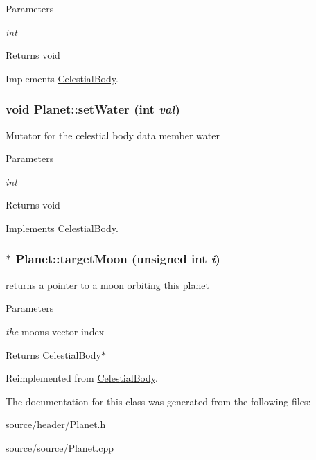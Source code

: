 \begin{DoxyParams}{Parameters}
\item[{\em int}]\end{DoxyParams}
\begin{DoxyReturn}{Returns}
void 
\end{DoxyReturn}


Implements \hyperlink{classCelestialBody}{CelestialBody}.

\hypertarget{classPlanet_afbc0d813ae0d2a958487cfc2a06fd9d1}{
\subsubsection[{setWater}]{\setlength{\rightskip}{0pt plus 5cm}void Planet::setWater (int {\em val})}}
\label{d5/dec/classPlanet_afbc0d813ae0d2a958487cfc2a06fd9d1}
Mutator for the celestial body data member water


\begin{DoxyParams}{Parameters}
\item[{\em int}]\end{DoxyParams}
\begin{DoxyReturn}{Returns}
void 
\end{DoxyReturn}


Implements \hyperlink{classCelestialBody}{CelestialBody}.

\hypertarget{classPlanet_a86eb8c5701ace894c2ca47b80ae776e9}{
\subsubsection[{targetMoon}]{ $\ast$ Planet::targetMoon (unsigned int {\em i})}}
\label{d5/dec/classPlanet_a86eb8c5701ace894c2ca47b80ae776e9}
returns a pointer to a moon orbiting this planet


\begin{DoxyParams}{Parameters}
\item[{\em the}]moons vector index\end{DoxyParams}
\begin{DoxyReturn}{Returns}
CelestialBody$\ast$ 
\end{DoxyReturn}


Reimplemented from \hyperlink{classCelestialBody_a7919f1dba305a225978fa901a34daf25}{CelestialBody}.



The documentation for this class was generated from the following files:\begin{DoxyCompactItemize}
\item 
source/header/Planet.h\item 
source/source/Planet.cpp\end{DoxyCompactItemize}
